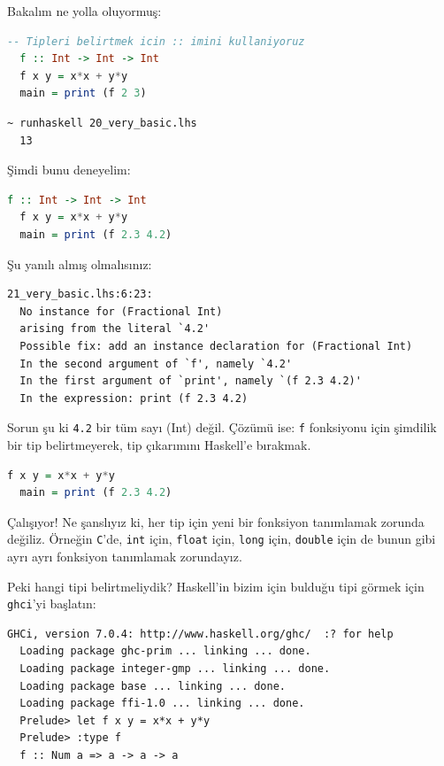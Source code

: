 \documentclass[a4paper,14pt,openany]{extbook} %
\begin{document}
Bakalım ne yolla oluyormuş:

\begin{lstlisting}[language=Haskell]
  -- Tipleri belirtmek icin :: imini kullaniyoruz
  f :: Int -> Int -> Int
  f x y = x*x + y*y
  main = print (f 2 3)
\end{lstlisting}

\begin{lstlisting}[language=shell,numbers=none,nolol]
  ~ runhaskell 20_very_basic.lhs
  13
\end{lstlisting}

Şimdi bunu deneyelim:

\begin{lstlisting}[language=Haskell]
  f :: Int -> Int -> Int
  f x y = x*x + y*y
  main = print (f 2.3 4.2)
\end{lstlisting}

Şu yanılı almış olmalısınız:

\begin{lstlisting}[language=shell,numbers=none,nolol]
  21_very_basic.lhs:6:23:
  No instance for (Fractional Int)
  arising from the literal `4.2'
  Possible fix: add an instance declaration for (Fractional Int)
  In the second argument of `f', namely `4.2'
  In the first argument of `print', namely `(f 2.3 4.2)'
  In the expression: print (f 2.3 4.2)
\end{lstlisting}

Sorun şu ki \lstinline!4.2! bir tüm sayı (Int) değil. Çözümü ise: \lstinline!f! fonksiyonu için şimdilik bir tip belirtmeyerek, tip çıkarımını Haskell'e bırakmak.

\begin{lstlisting}[language=Haskell]
  f x y = x*x + y*y
  main = print (f 2.3 4.2)
\end{lstlisting}

Çalışıyor! Ne şanslıyız ki, her tip için yeni bir fonksiyon tanımlamak
zorunda değiliz. Örneğin \lstinline!C!'de, \lstinline!int! için,
\lstinline!float! için, \lstinline!long! için, \lstinline!double! için
de bunun gibi ayrı ayrı fonksiyon tanımlamak zorundayız.

Peki hangi tipi belirtmeliydik? Haskell'in bizim için bulduğu tipi
görmek için \lstinline!ghci!'yi başlatın:

\begin{lstlisting}[language=shell,numbers=none,nolol]
  GHCi, version 7.0.4: http://www.haskell.org/ghc/  :? for help
  Loading package ghc-prim ... linking ... done.
  Loading package integer-gmp ... linking ... done.
  Loading package base ... linking ... done.
  Loading package ffi-1.0 ... linking ... done.
  Prelude> let f x y = x*x + y*y
  Prelude> :type f
  f :: Num a => a -> a -> a
\end{lstlisting}
\end{document}
